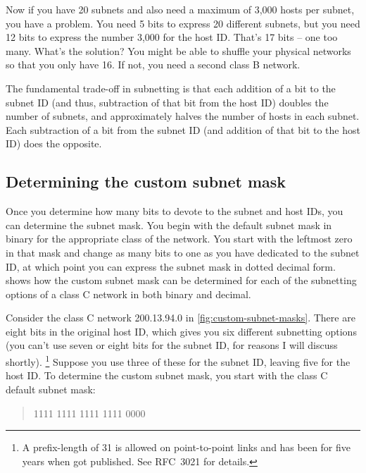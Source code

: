 Now if you have 20 subnets and also need a maximum of 3,000 hosts per
subnet, you have a problem. You need 5 bits to express 20 different
subnets, but you need 12 bits to express the number 3,000 for the host
ID. That's 17 bits -- one too many. What's the solution? You might be able to
shuffle your physical networks so that you only have 16. If not, you
need a second class B network.

\begin{keyconcept}
The fundamental trade-off in subnetting is that each addition of a bit to the subnet ID (and thus, subtraction of that bit from the host ID)
doubles the number of subnets, and approximately halves the number of hosts in each subnet.
Each subtraction of a bit from the subnet ID (and addition of that bit to the host ID) does the opposite.
\end{keyconcept}


\subsection{Determining the custom subnet mask}

Once you determine how many bits to devote to the subnet and host IDs,
you can determine the subnet mask. You begin with the default subnet
mask in binary for the appropriate class of the network. You start with
the leftmost zero in that mask and change as many bits to one as you
have dedicated to the subnet ID, at which point you can express the subnet mask in dotted decimal form.
 shows how the custom subnet mask can be determined for each of the
subnetting options of a class C network in both binary and decimal.

Consider the class C network 200.13.94.0 in \cref{fig:custom-subnet-masks}.
There are eight bits in the original host ID, which gives you six different subnetting options
(you can't use seven or eight bits for the subnet ID, for reasons I will discuss shortly).%
   \footnote{A prefix-length of 31 is allowed on point-to-point links and has been for five years when \cite{kozierok05} got published. See RFC~3021 for details.}
Suppose you use three of these for the subnet ID, leaving five for the host ID.
To determine the custom subnet mask, you start with the class C default subnet mask:

\begin{quote}
1111 1111 1111 1111 0000
\end{quote}

